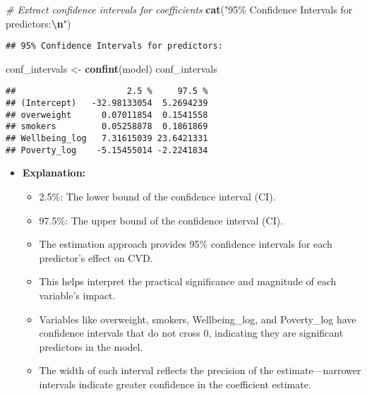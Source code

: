 \documentclass[
]{article}
\newenvironment{Shaded}{\begin{snugshade}}{\end{snugshade}}
\newcommand{\CommentTok}[1]{\textcolor[rgb]{0.56,0.35,0.01}{\textit{#1}}}
\newcommand{\FunctionTok}[1]{\textcolor[rgb]{0.13,0.29,0.53}{\textbf{#1}}}
\newcommand{\NormalTok}[1]{#1}
\newcommand{\OtherTok}[1]{\textcolor[rgb]{0.56,0.35,0.01}{#1}}
\newcommand{\SpecialCharTok}[1]{\textcolor[rgb]{0.81,0.36,0.00}{\textbf{#1}}}
\newcommand{\StringTok}[1]{\textcolor[rgb]{0.31,0.60,0.02}{#1}}
\providecommand{\tightlist}{%
  \setlength{\itemsep}{0pt}\setlength{\parskip}{0pt}}
\begin{document}
\begin{Shaded}
\begin{Highlighting}[]
\CommentTok{\# Extract confidence intervals for coefficients}
\FunctionTok{cat}\NormalTok{(}\StringTok{"95\% Confidence Intervals for predictors:}\SpecialCharTok{\textbackslash{}n}\StringTok{"}\NormalTok{)}
\end{Highlighting}
\end{Shaded}

\begin{verbatim}
## 95% Confidence Intervals for predictors:
\end{verbatim}

\begin{Shaded}
\begin{Highlighting}[]
\NormalTok{conf\_intervals }\OtherTok{\textless{}{-}} \FunctionTok{confint}\NormalTok{(model)}
\NormalTok{conf\_intervals}
\end{Highlighting}
\end{Shaded}

\begin{verbatim}
##                      2.5 %     97.5 %
## (Intercept)   -32.98133054  5.2694239
## overweight      0.07011854  0.1541558
## smokers         0.05258878  0.1861869
## Wellbeing_log   7.31615039 23.6421331
## Poverty_log    -5.15455014 -2.2241834
\end{verbatim}

\begin{itemize}
\tightlist
\item
  \textbf{Explanation:}

  \begin{itemize}
  \tightlist
  \item
    2.5\%: The lower bound of the confidence interval (CI).
  \item
    97.5\%: The upper bound of the confidence interval (CI).
  \item
    The estimation approach provides 95\% confidence intervals for each
    predictor's effect on CVD.
  \item
    This helps interpret the practical significance and magnitude of
    each variable's impact.
  \item
    Variables like overweight, smokers, Wellbeing\_log, and Poverty\_log
    have confidence intervals that do not cross 0, indicating they are
    significant predictors in the model.
  \item
    The width of each interval reflects the precision of the
    estimate---narrower intervals indicate greater confidence in the
    coefficient estimate.
  \end{itemize}
\end{itemize}
\end{document}

